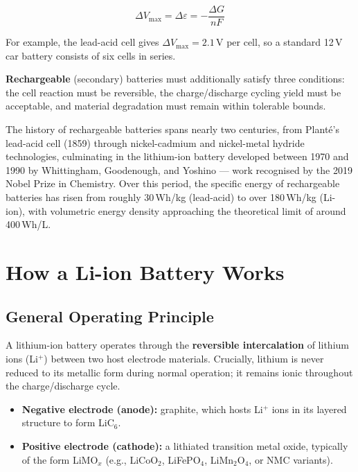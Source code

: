 \begin{equation}
    \Delta V_{\max} = \Delta\varepsilon = -\frac{\Delta G}{nF}
\end{equation}

For example, the lead-acid cell gives $\Delta V_{\max} = 2.1\,\text{V}$ per cell, so a standard 12\,V car battery consists of six cells in series.

\textbf{Rechargeable} (secondary) batteries must additionally satisfy three conditions: the cell reaction must be reversible, the charge/discharge cycling yield must be acceptable, and material degradation must remain within tolerable bounds.

The history of rechargeable batteries spans nearly two centuries, from Planté's lead-acid cell (1859) through nickel-cadmium and nickel-metal hydride technologies, culminating in the lithium-ion battery developed between 1970 and 1990 by Whittingham, Goodenough, and Yoshino — work recognised by the 2019 Nobel Prize in Chemistry. Over this period, the specific energy of rechargeable batteries has risen from roughly 30\,Wh/kg (lead-acid) to over 180\,Wh/kg (Li-ion), with volumetric energy density approaching the theoretical limit of around 400\,Wh/L.

\section{How a Li-ion Battery Works}

\subsection{General Operating Principle}

A lithium-ion battery operates through the \textbf{reversible intercalation} of lithium ions (Li$^+$) between two host electrode materials. Crucially, lithium is never reduced to its metallic form during normal operation; it remains ionic throughout the charge/discharge cycle.

\begin{itemize}
    \item \textbf{Negative electrode (anode):} graphite, which hosts Li$^+$ ions in its layered structure to form LiC$_6$.
    \item \textbf{Positive electrode (cathode):} a lithiated transition metal oxide, typically of the form LiMO$_x$ (e.g., LiCoO$_2$, LiFePO$_4$, LiMn$_2$O$_4$, or NMC variants).
\end{itemize}

